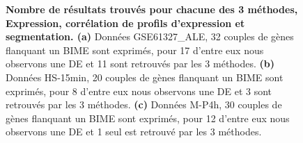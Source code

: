 \documentclass[12pt,a4paper]{report}
\begin{document}
\begin{figure}[h!]
\caption{\textbf{Nombre de résultats trouvés pour chacune des 3 méthodes, Expression, corrélation de profils d'expression et segmentation. (a)} Données GSE61327\_ALE, 32 couples de gènes flanquant un BIME sont exprimés, pour 17 d'entre eux nous observons une DE et 11 sont retrouvés par les 3 méthodes. \textbf{(b)} Données HS-15min, 20 couples de gènes flanquant un BIME sont exprimés, pour 8 d'entre eux nous observons une DE et 3 sont retrouvés par les 3 méthodes. \textbf{(c)} Données M-P4h, 30 couples de gènes flanquant un BIME sont exprimés, pour 12 d'entre eux nous observons une DE et 1 seul est retrouvé par les 3 méthodes.} 
\end{figure}
\end{document}

